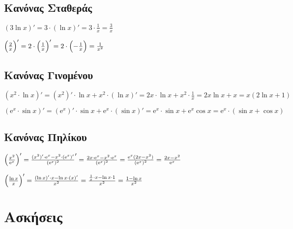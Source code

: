 \subsection*{Κανόνας Σταθεράς}
\begin{example}
  $( 3 \ln{x})' = 3 \cdot (\ln{x} )' = 3 \cdot \frac{1}{x} = \frac{3}{x} $
\end{example}
\begin{example}
  $\Bigl(\frac{2}{x}\Bigr)' = 2 \cdot \Bigl(\frac{1}{x}\Bigr)' = 2 \cdot
  \Bigl(-\frac{1}{x}\Bigr) = \frac{1}{x^{2}} $
\end{example}

\subsection*{Κανόνας Γινομένου}
\begin{example}
  $ (x^{2}\cdot \ln{x})' = (x^{2})' \cdot \ln{x} + x^{2}\cdot (\ln{x})' = 2x \cdot
  \ln{x} + x^{2} \cdot \frac{1}{x} = 2x \ln{x} + x = x(2 \ln{x} +1) $
\end{example}
\begin{example}
  $ (\mathrm{e}^{x} \cdot \sin{x})' = (\mathrm{e}^{x} )'\cdot \sin{x} +
  \mathrm{e}^{x} \cdot (\sin{x} )' = \mathrm{e}^{x} \cdot \sin{x} + \mathrm{e}^{x}
  \cos{x} = \mathrm{e}^{x} \cdot (\sin{x} + \cos{x} ) $
\end{example}

\subsection*{Κανόνας Πηλίκου}
\begin{example}
  $ \Bigl(\frac{x^{2}}{\mathrm{e}^{x}}\Bigr)' = \frac{(x^{2})' \cdot \mathrm{e}^{x} 
  - x^{2}\cdot (\mathrm{e}^{x} )'}{(\mathrm{e}^{x})^{2}}' 
  = \frac{2x \cdot \mathrm{e}^{x} - x^{2}\cdot \mathrm{e}^{x}}{(\mathrm{e}^{x}) ^{2}} 
  = \frac{\mathrm{e}^{x} (2x-x^{2})}{(\mathrm{e}^{x})^2} = 
  \frac{2x - x^{2}}{\mathrm{e}^{x}} $
\end{example}
\begin{example}
  $\Bigl( \frac{\ln{x}}{x}\Bigr)' = \frac{(\ln{x} )' \cdot x- \ln{x} \cdot (x)'}{x^{2}} 
  = \frac{\frac{1}{x} \cdot x - \ln{x} \cdot 1}{x^{2}} = \frac{1- \ln{x}}{x^{2}} $
\end{example}


\section*{Ασκήσεις}

